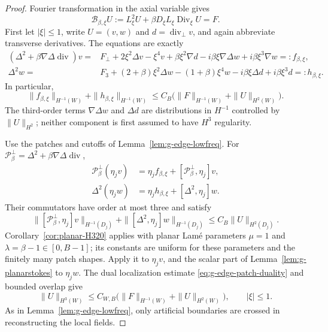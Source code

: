\documentclass[11pt,a4paper]{article}
\theoremstyle{remark}
\numberwithin{equation}{section}
\begin{document}
\begin{proof}
Fourier transformation in the axial variable gives
\[
 \mathcal B_{\beta,\xi}U
 :=L_\xi^2U+\beta D_\xi L_\xi\operatorname{Div}_\xi U=F.
\]
First let $|\xi|\le1$, write $U=(v,w)$ and
$d=\operatorname{div}_\perp v$, and again abbreviate transverse derivatives.
The equations are exactly
\[
\begin{aligned}
 (\Delta^2+\beta\nabla\Delta\operatorname{div})v
 ={}&F_\perp+2\xi^2\Delta v-\xi^4v
       +\beta\xi^2\nabla d
       -i\beta\xi\nabla\Delta w+i\beta\xi^3\nabla w=:f_{\beta,\xi},\\
 \Delta^2w
 ={}&F_3+(2+\beta)\xi^2\Delta w-(1+\beta)\xi^4w
       -i\beta\xi\Delta d+i\beta\xi^3d=:h_{\beta,\xi}.
\end{aligned}
\]
In particular,
\[
 \|f_{\beta,\xi}\|_{H^{-1}(W)}
       +\|h_{\beta,\xi}\|_{H^{-1}(W)}
 \le C_B\bigl(\|F\|_{H^{-1}(W)}+\|U\|_{H^2(W)}\bigr).
\]
The third-order terms $\nabla\Delta w$ and $\Delta d$ are distributions
in $H^{-1}$ controlled by $\|U\|_{H^2}$; neither component is first
assumed to have $H^3$ regularity.

Use the patches and cutoffs of Lemma~\ref{lem:g-edge-lowfreq}. For
$\mathcal P^\perp_\beta=\Delta^2+\beta\nabla\Delta\operatorname{div}$,
\[
\begin{aligned}
 \mathcal P^\perp_\beta(\eta_jv)
 &=\eta_jf_{\beta,\xi}+[\mathcal P^\perp_\beta,\eta_j]v,\\
 \Delta^2(\eta_jw)
 &=\eta_jh_{\beta,\xi}+[\Delta^2,\eta_j]w.
\end{aligned}
\]
Their commutators have order at most three and satisfy
\[
 \|[\mathcal P^\perp_\beta,\eta_j]v\|_{H^{-1}(D_j)}
       +\|[\Delta^2,\eta_j]w\|_{H^{-1}(D_j)}
 \le C_B\|U\|_{H^2(D_j)}.
\]
Corollary~\ref{cor:planar-H320} applies with planar Lam\'e parameters
$\mu=1$ and $\lambda=\beta-1\in[0,B-1]$; its constants are uniform for
these parameters and the finitely many patch shapes. Apply it to
$\eta_jv$, and the scalar part of Lemma~\ref{lem:g-planarstokes} to
$\eta_jw$. The dual localization estimate
\eqref{eq:g-edge-patch-duality} and bounded overlap give
\begin{equation}\label{eq:g-lame-lowfreq}
 \|U\|_{H^3(W)}
 \le C_{W,B}\bigl(\|F\|_{H^{-1}(W)}+\|U\|_{H^2(W)}\bigr),
 \qquad |\xi|\le1.
\end{equation}
As in Lemma~\ref{lem:g-edge-lowfreq}, only artificial boundaries are crossed
in reconstructing the local fields.


\end{proof}
\end{document}
